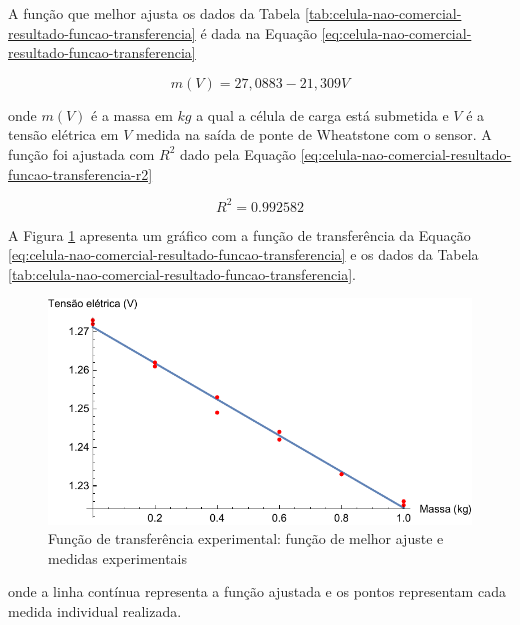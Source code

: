 \documentclass[a4paper]{instrumentacao}
\begin{document}
A função que melhor ajusta os dados da Tabela \ref{tab:celula-nao-comercial-resultado-funcao-transferencia} é dada na Equação \ref{eq:celula-nao-comercial-resultado-funcao-transferencia}

\begin{equation}
	m(V) = 27,0883 - 21,309 V
	\label{eq:celula-nao-comercial-resultado-funcao-transferencia}
\end{equation}

\noindent onde $m(V)$ é a massa em $kg$ a qual a célula de carga está submetida e $V$ é a tensão elétrica em $V$ medida na saída de ponte de Wheatstone com o sensor. A função foi ajustada com $R^2$ dado pela Equação \ref{eq:celula-nao-comercial-resultado-funcao-transferencia-r2}

\begin{equation}
	R^2 = 0.992582
	\label{eq:celula-nao-comercial-resultado-funcao-transferencia-r2}
\end{equation}


A Figura \ref{fig:celula-nao-comercial-resultado-funcao-transferencia} apresenta um gráfico com a função de transferência da Equação \ref{eq:celula-nao-comercial-resultado-funcao-transferencia} e os dados da Tabela \ref{tab:celula-nao-comercial-resultado-funcao-transferencia}.

\begin{figure}[H]
\center
\includegraphics[width=\textwidth]{NaoComercial-Plot.pdf}
\caption{Função de transferência experimental: função de melhor ajuste e medidas experimentais}
\label{fig:celula-nao-comercial-resultado-funcao-transferencia}
\end{figure}

\noindent onde a linha contínua representa a função ajustada e os pontos representam cada medida individual realizada.
\end{document}
